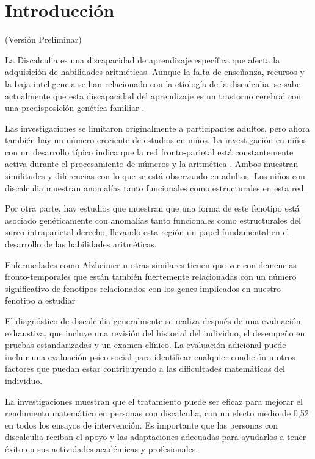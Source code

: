 \section{Introducción}

(Versión Preliminar)

La Discalculia es una discapacidad de aprendizaje específica que afecta la adquisición de habilidades aritméticas. Aunque la falta de  enseñanza, recursos y la baja inteligencia se han relacionado con la etiología de la discalculia, se sabe actualmente que esta discapacidad del aprendizaje es un trastorno cerebral con una predisposición genética familiar \cite{Molko2003}.

\hfill

Las investigaciones se limitaron originalmente a participantes adultos, pero ahora también hay un número creciente de estudios en niños. La investigación en niños con un desarrollo típico indica que la red fronto-parietal está constantemente activa durante el procesamiento de números y la aritmética \cite{originDis}. Ambos muestran similitudes y diferencias con lo que se está observando en adultos. Los niños con discalculia muestran anomalías tanto funcionales como estructurales en esta red.

\hfill


Por otra parte, hay estudios \cite{Molko2003,Shalev2001} que muestran que una forma de este fenotipo está asociado genéticamente con anomalías tanto funcionales como estructurales del surco intraparietal derecho, llevando esta región un papel fundamental en el desarrollo de las habilidades aritméticas.

\hfill

Enfermedades como Alzheimer u otras similares tienen que ver con demencias fronto-temporales \cite{Walterfang2014} que están también fuertemente relacionadas con un número significativo de fenotipos relacionados con los genes implicados en nuestro fenotipo a estudiar

\hfill

El diagnóstico de discalculia generalmente \cite{TreatmentDis} se realiza después de una evaluación exhaustiva, que incluye una revisión del historial del individuo, el desempeño en pruebas estandarizadas y un examen clínico. La evaluación adicional puede incluir una evaluación psico-social para identificar cualquier condición u otros factores que puedan estar contribuyendo a las dificultades matemáticas del individuo.

\hfill

La investigaciones muestran que el tratamiento puede ser eficaz para mejorar el rendimiento matemático en personas con discalculia, con un efecto medio de 0,52 \cite{TreatmentDis} en todos los ensayos de intervención. Es importante que las personas con discalculia reciban el apoyo y las adaptaciones adecuadas para ayudarlos a tener éxito en sus actividades académicas y profesionales.

